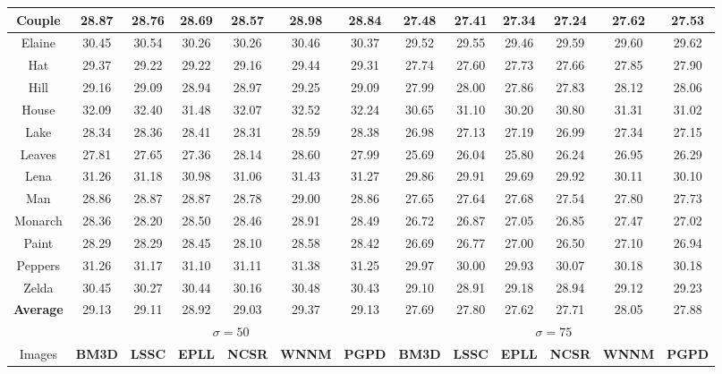 \begin{table}[t]
\begin{adjustwidth}{-0.5cm}{}
\begin{center}
\begin{tabular}{|c||c|c|c|c|c|c||c|c|c|c|c|c|}
\\
\hline
 Couple & 28.87  & 28.76  & 28.69 & 28.57 & 28.98 & 28.84    & 27.48 & 27.41 &  27.34  & 27.24 & 27.62 & 27.53   
\\
\hline
 Elaine& 30.45 & 30.54 & 30.26   &  30.26  & 30.46 & 30.37    &29.52 & 29.55 & 29.46 & 29.59 & 29.60 &29.62   
\\
\hline
 Hat& 29.37 & 29.22  & 29.22   &  29.16  & 29.44  &29.31    & 27.74 & 27.60 &  27.73  &  27.66 & 27.85  &27.90   
\\
\hline
 Hill & 29.16 & 29.09 & 28.94 & 28.97 & 29.25 & 29.09    & 27.99 & 28.00 & 27.86 & 27.83 & 28.12 & 28.06 
\\
\hline
 House& 32.09 & 32.40  & 31.48  & 32.07 & 32.52 & 32.24    & 30.65  & 31.10 & 30.20 & 30.80  & 31.31 &31.02    
\\
\hline
 Lake   & 28.34 & 28.36  & 28.41   & 28.31   &  28.59 &28.38    & 26.98  & 27.13 &27.19  & 26.99 &27.34 & 27.15  
\\
\hline
 Leaves & 27.81 & 27.65& 27.36 & 28.14 & 28.60 &27.99     & 25.69 & 26.04 & 25.80 &26.24 & 26.95 & 26.29  
\\
\hline
 Lena& 31.26 & 31.18  & 30.98 &  31.06& 31.43 &31.27     & 29.86& 29.91 & 29.69& 29.92 & 30.11 &30.10   
\\
\hline
 Man& 28.86 & 28.87 & 28.87 & 28.78 & 29.00 & 28.86    & 27.65  & 27.64 & 27.68& 27.54 &27.80 & 27.73     
\\
\hline
 Monarch& 28.36 & 28.20 & 28.50 & 28.46 & 28.91 &28.49    &   26.72  & 26.87 &27.05  & 26.85 & 27.47 &27.02    
\\
\hline
 Paint & 28.29 & 28.29 & 28.45  &  28.10  & 28.58 &28.42    &  26.69 &  26.77 & 27.00  & 26.50 & 27.10 & 26.94 
\\
\hline
 Peppers & 31.26 & 31.17 & 31.10 & 31.11  & 31.38 & 31.25   &   29.97  & 30.00&  29.93 &  30.07 & 30.18 & 30.18    
\\
\hline
 Zelda & 30.45 & 30.27  & 30.44  &  30.16  & 30.48 &30.43    & 29.10&28.91 &29.18  & 28.94 & 29.12 &29.23   
\\
\hline
 \textbf{Average} &  29.13 & 29.11  &  28.92 & 29.03  & 29.37 & 29.13   &27.69&27.80 & 27.62& 27.71&28.05 &27.88     
\\
\hline
\hline
&\multicolumn{6}{c||}{ $\sigma = 50$}&\multicolumn{6}{c|}{ $\sigma = 75$}
\\
\hline
\hline
Images&\textbf{BM3D}&\textbf{LSSC}&\textbf{EPLL}&\textbf{NCSR}&\textbf{WNNM}&\textbf{PGPD}
&\textbf{BM3D}&\textbf{LSSC}&\textbf{EPLL}&\textbf{NCSR}&\textbf{WNNM}&\textbf{PGPD} 

\end{tabular}
\end{center}
\end{adjustwidth}
\end{table}

